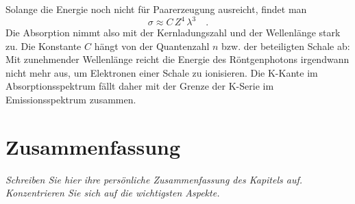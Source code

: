 Solange die Energie noch nicht für Paarerzeugung ausreicht, findet man
\begin{equation}
    \sigma \approx C \, Z^4 \, \lambda^3 \quad .
\end{equation}
Die Absorption nimmt also mit der Kernladungszahl und der Wellenlänge stark zu. Die Konstante $C$ hängt von der Quantenzahl $n$ bzw. der beteiligten Schale ab: Mit zunehmender Wellenlänge reicht die Energie des Röntgenphotons irgendwann nicht mehr aus, um Elektronen einer Schale zu ionisieren. Die K-Kante im Absorptionsspektrum fällt daher mit der Grenze der K-Serie im Emissionsspektrum zusammen.


\newpage

\section{Zusammenfassung}

\textit{Schreiben Sie hier ihre persönliche Zusammenfassung des Kapitels auf. Konzentrieren Sie sich auf die wichtigsten Aspekte.}

\vspace*{10cm}


\printbibliography[segment=\therefsegment,heading=subbibliography]
